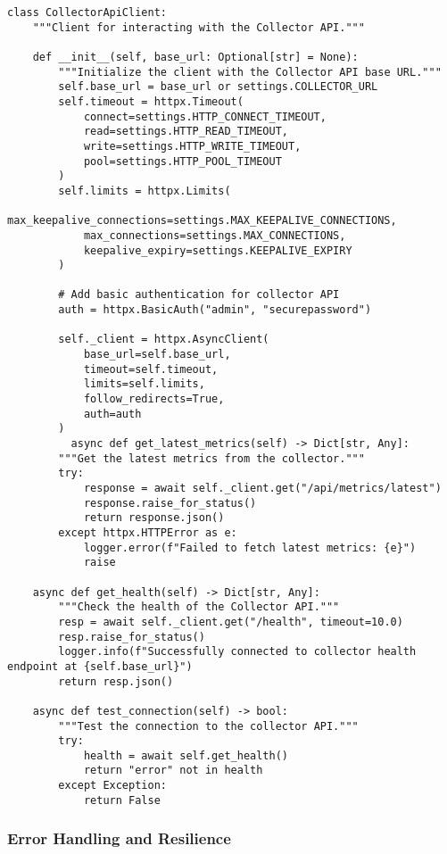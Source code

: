 \begin{lstlisting}[style=pythoncode, caption=Service Integration Client]
class CollectorApiClient:
    """Client for interacting with the Collector API."""
    
    def __init__(self, base_url: Optional[str] = None):
        """Initialize the client with the Collector API base URL."""
        self.base_url = base_url or settings.COLLECTOR_URL
        self.timeout = httpx.Timeout(
            connect=settings.HTTP_CONNECT_TIMEOUT,
            read=settings.HTTP_READ_TIMEOUT,
            write=settings.HTTP_WRITE_TIMEOUT,
            pool=settings.HTTP_POOL_TIMEOUT
        )
        self.limits = httpx.Limits(
            max_keepalive_connections=settings.MAX_KEEPALIVE_CONNECTIONS,
            max_connections=settings.MAX_CONNECTIONS,
            keepalive_expiry=settings.KEEPALIVE_EXPIRY
        )
        
        # Add basic authentication for collector API
        auth = httpx.BasicAuth("admin", "securepassword")
        
        self._client = httpx.AsyncClient(
            base_url=self.base_url, 
            timeout=self.timeout,
            limits=self.limits,
            follow_redirects=True,
            auth=auth
        )
          async def get_latest_metrics(self) -> Dict[str, Any]:
        """Get the latest metrics from the collector."""
        try:
            response = await self._client.get("/api/metrics/latest")
            response.raise_for_status()
            return response.json()
        except httpx.HTTPError as e:
            logger.error(f"Failed to fetch latest metrics: {e}")
            raise
            
    async def get_health(self) -> Dict[str, Any]:
        """Check the health of the Collector API."""
        resp = await self._client.get("/health", timeout=10.0)
        resp.raise_for_status()
        logger.info(f"Successfully connected to collector health endpoint at {self.base_url}")
        return resp.json()

    async def test_connection(self) -> bool:
        """Test the connection to the collector API."""
        try:
            health = await self.get_health()
            return "error" not in health
        except Exception:
            return False
\end{lstlisting}

\subsubsection{Error Handling and Resilience}

